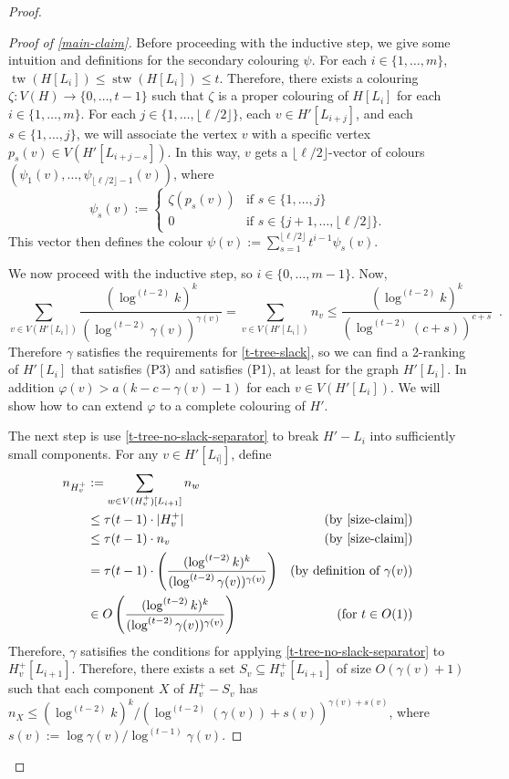 \documentclass[kpfonts]{patmorin}
\DeclareMathOperator{\tw}{tw}
\DeclareMathOperator{\stw}{stw}
\newcommand{\ellt}{{\lfloor\ell/2\rfloor}}
\theoremstyle{named}
\begin{document}
\begin{proof}
\begin{proof}[Proof of \cref{main-claim}]
        Before proceeding with the inductive step, we give some intuition and definitions for the secondary colouring $\psi$. For each $i\in\{1,\ldots,m\}$, $\tw(H[L_i])\le \stw(H[L_i])\le t$. Therefore, there exists a colouring $\zeta:V(H)\to\{0,\ldots,t-1\}$ such that $\zeta$ is a proper colouring of $H[L_i]$ for each $i\in\{1,\ldots,m\}$. For each $j\in\{1,\ldots,\ellt\}$, each $v\in H'[L_{i+j}]$, and each $s\in\{1,\ldots,j\}$, we will associate the vertex $v$ with a specific vertex $p_s(v)\in V(H'[L_{i+j-s}])$.  In this way, $v$ gets a $\ellt$-vector of colours $(\psi_1(v),\ldots,\psi_{\ellt-1}(v))$, where
        \[
            \psi_s(v) :=
                \begin{cases}
                    \zeta(p_s(v)) & \text{if $s\in\{1,\ldots,j\}$} \\
                    0             & \text{if $s\in\{j+1,\ldots,\ellt\}$.}
                \end{cases}
        \]
        This vector then defines the colour $\psi(v):=\sum_{s=1}^\ellt t^{i-1}\psi_s(v)$.

        We now proceed with the inductive step, so $i\in\{0,\ldots,m-1\}$.
        Now,
        \[
            \sum_{v\in V(H'[L_i])}\frac{(\log^{(t-2)} k)^k}{(\log^{(t-2)} \gamma(v))^{\gamma(v)}}
            = \sum_{v\in V(H'[L_i])} n_v
            \le \frac{(\log^{(t-2)} k)^k}{(\log^{(t-2)} (c+s))^{c+s}} \enspace .
        \]
       Therefore $\gamma$ satisfies the requirements for \cref{t-tree-slack}, so we can find a 2-ranking of $H'[L_i]$ that satisfies (P3) and satisfies (P1), at least for the graph $H'[L_i]$. In addition $\varphi(v)> a(k-c-\gamma(v)-1)$ for each $v\in V(H'[L_i])$.  We will show how to can extend $\varphi$ to a complete colouring of $H'$.

       The next step is use \cref{t-tree-no-slack-separator} to break $H'-L_i$ into sufficiently small components.  For any $v\in H'[L_{i]}]$, define
       \begin{align*}
          n_{H^+_v} & := \sum_{w\in V(H^+_v)[L_{i+1}]} n_w \\
                    & \le \tau(t-1)\cdot|H^+_v| & \text{(by \cref{size-claim})} \\
                    & \le \tau(t-1)\cdot n_v & \text{(by \cref{size-claim})} \\
                    & = \tau(t-1)\cdot\left(\frac{(\log^{(t-2)}k)^k}{(\log^{(t-2)}\gamma(v))^{\gamma(v)}}\right)
                    & \text{(by definition of $\gamma(v)$)} \\
                    & \in O\left(\frac{(\log^{(t-2)}k)^k}{(\log^{(t-2)}\gamma(v))^{\gamma(v)}}\right) &\text{(for $t\in O(1)$)}
       \end{align*}
       Therefore, $\gamma$ satisifies the conditions for applying \cref{t-tree-no-slack-separator} to $H^+_v[L_{i+1}]$.  Therefore, there exists a set $S_v\subseteq H^+_v[L_{i+1}]$ of size $O(\gamma(v)+1)$ such that each component $X$ of $H^+_v-S_v$ has $n_X\le (\log^{(t-2)} k)^k/(\log^{(t-2)} (\gamma(v))+s(v))^{\gamma(v)+s(v)}$, where $s(v):=\log\gamma(v)/\log^{(t-1)}\gamma(v)$.


\end{proof}
\end{proof}
\end{document}
